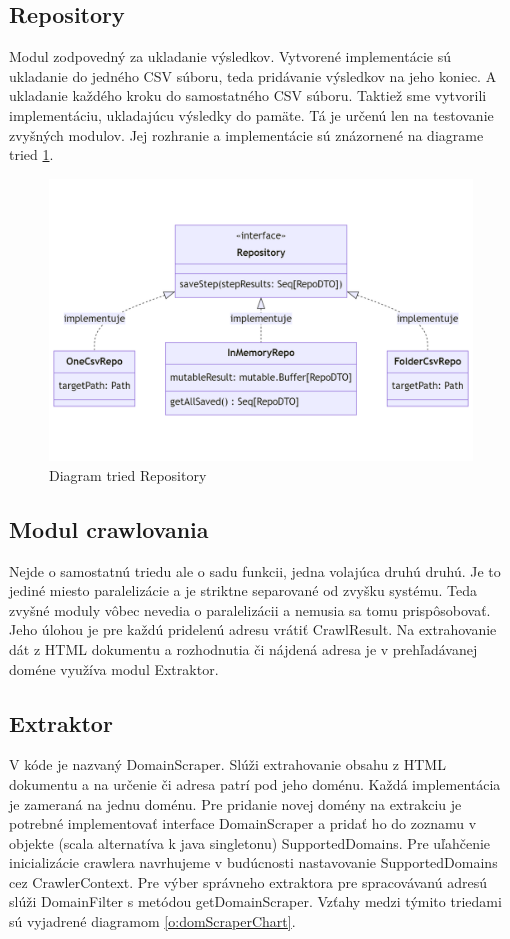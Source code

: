 \subsection{Repository}
Modul zodpovedný za ukladanie výsledkov. Vytvorené implementácie sú ukladanie do jedného CSV súboru, teda pridávanie výsledkov na jeho koniec. A ukladanie každého kroku do samostatného CSV súboru. Taktiež sme vytvorili implementáciu, ukladajúcu výsledky do pamäte. Tá je určenú len na testovanie zvyšných modulov. Jej rozhranie a implementácie sú znázornené na diagrame tried \ref{o:repoClassChart}. 

\begin{figure}[!ht]
    \centering
    \includegraphics[width=1\textwidth]{figures/repositoryClassChart.png}
    \caption{Diagram tried Repository\label{o:repoClassChart}}
\end{figure}

\subsection{Modul crawlovania}
Nejde o samostatnú triedu ale o sadu funkcii, jedna volajúca druhú druhú. Je to jediné miesto paralelizácie a je striktne separované od zvyšku systému. Teda zvyšné moduly vôbec nevedia o paralelizácii a nemusia sa tomu prispôsobovať. Jeho úlohou je pre každú pridelenú adresu vrátiť CrawlResult. Na extrahovanie dát z HTML dokumentu a rozhodnutia či nájdená adresa je v prehľadávanej doméne využíva modul Extraktor. 

\subsection{Extraktor}
V kóde je nazvaný DomainScraper. Slúži extrahovanie obsahu z HTML dokumentu a na určenie či adresa patrí pod jeho doménu. Každá implementácia je zameraná na jednu doménu. Pre pridanie novej domény na extrakciu je potrebné implementovať interface DomainScraper a pridať ho do zoznamu v objekte (scala alternatíva k java singletonu) SupportedDomains. Pre uľahčenie inicializácie crawlera navrhujeme v budúcnosti nastavovanie SupportedDomains cez CrawlerContext. Pre výber správneho extraktora pre spracovávanú adresú slúži DomainFilter s metódou getDomainScraper. Vzťahy medzi týmito triedami sú vyjadrené diagramom \ref{o:domScraperChart}.

